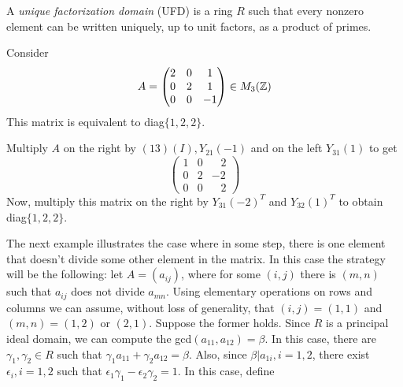 \begin{dang}
    \begin{definition}\cite{hungerford2012algebra}
        A \textit{unique factorization domain} (UFD) is a ring $R$ such that every nonzero element can be written uniquely, up to unit factors, as a product of primes.
    \end{definition}
\end{dang}

\begin{dang}
    \begin{example}\label{example_for_invariant_factor_theorem_1}
        Consider
        \begin{equation}
            A = \begin{pmatrix}
                2 & 0 & 1\\
                0 & 2 & 1\\
                0 & 0 & -1
            \end{pmatrix}\in M_3(\mathbb{Z})
        \end{equation}
        This matrix is equivalent to diag$\{1,2,2\}$.
    \end{example}
\end{dang}
Multiply $A$ on the right by $(13)(I), Y_{21}(-1)$ and on the left $Y_{31}(1)$ to get
\begin{equation}
    \begin{pmatrix}
        1 & 0 & \;\;\;2\\
        0 & 2 & -2\\
        0 & 0 & \;\;\;2
    \end{pmatrix}
\end{equation}
Now, multiply this matrix on the right by $Y_{31}(-2)^T$ and $Y_{32}(1)^T$ to obtain diag$\{1,2,2\}$.\par
The next example illustrates the case where in some step, there is one element that doesn't divide some other element in the matrix. In this case the strategy will be the following: let $A=(a_{ij})$, where for some $(i,j)$ there is $(m,n)$ such that $a_{ij}$ does not divide $a_{mn}$. Using elementary operations on rows and columns we can assume, without loss of generality, that $(i,j)=(1,1)$ and $(m,n)=(1,2)$ or $(2,1)$. Suppose the former holds. Since $R$ is a principal ideal domain, we can compute the gcd$(a_{11},a_{12})=\beta$. In this case, there are $\gamma_1,\gamma_2\in R$ such that $\gamma_1a_{11}+\gamma_2a_{12}=\beta$. Also, since $\beta | a_{1i}, i=1,2$, there exist $\epsilon_i, i=1,2$ such that $\epsilon_1\gamma_1-\epsilon_2\gamma_2=1$. In this case, define
